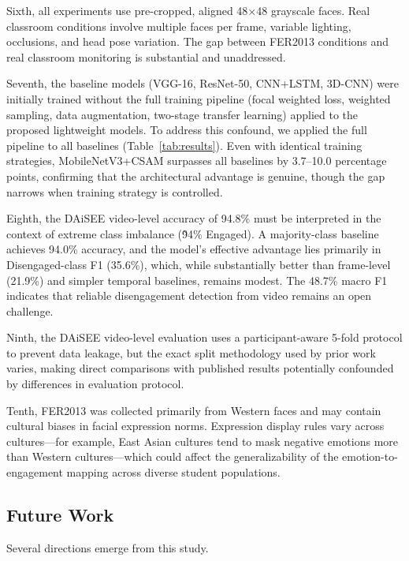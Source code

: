 \documentclass[sensors,article,submit,pdftex,moreauthors]{Definitions/mdpi}
\begin{document}
Sixth, all experiments use pre-cropped, aligned 48$\times$48 grayscale faces. Real classroom conditions involve multiple faces per frame, variable lighting, occlusions, and head pose variation. The gap between FER2013 conditions and real classroom monitoring is substantial and unaddressed.

Seventh, the baseline models (VGG-16, ResNet-50, CNN+LSTM, 3D-CNN) were initially trained without the full training pipeline (focal weighted loss, weighted sampling, data augmentation, two-stage transfer learning) applied to the proposed lightweight models. To address this confound, we applied the full pipeline to all baselines (Table~\ref{tab:results}). Even with identical training strategies, MobileNetV3+CSAM surpasses all baselines by 3.7--10.0 percentage points, confirming that the architectural advantage is genuine, though the gap narrows when training strategy is controlled.

Eighth, the DAiSEE video-level accuracy of 94.8\% must be interpreted in the context of extreme class imbalance (\~94\% Engaged). A majority-class baseline achieves 94.0\% accuracy, and the model's effective advantage lies primarily in Disengaged-class F1 (35.6\%), which, while substantially better than frame-level (21.9\%) and simpler temporal baselines, remains modest. The 48.7\% macro F1 indicates that reliable disengagement detection from video remains an open challenge.

Ninth, the DAiSEE video-level evaluation uses a participant-aware 5-fold protocol to prevent data leakage, but the exact split methodology used by prior work varies, making direct comparisons with published results potentially confounded by differences in evaluation protocol.

Tenth, FER2013 was collected primarily from Western faces and may contain cultural biases in facial expression norms. Expression display rules vary across cultures---for example, East Asian cultures tend to mask negative emotions more than Western cultures---which could affect the generalizability of the emotion-to-engagement mapping across diverse student populations.

\subsection{Future Work}

Several directions emerge from this study.
\end{document}
